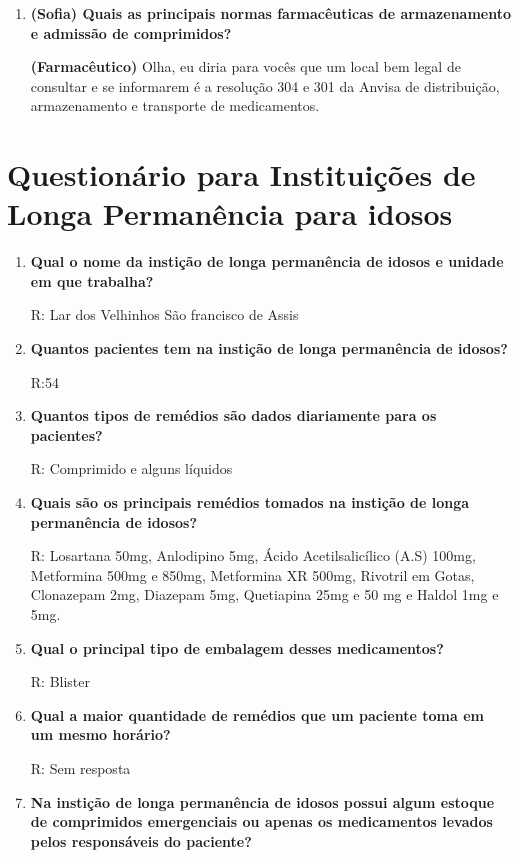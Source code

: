 \begin{apendicesenv}
\begin{enumerate}
\item \textbf{(Sofia) Quais as principais normas farmacêuticas de armazenamento e admissão de comprimidos?}

\textbf{(Farmacêutico)} Olha, eu diria para vocês que um local bem legal de consultar e se informarem é a resolução 304 e 301 da Anvisa de distribuição, armazenamento e transporte de medicamentos. 
\end{enumerate}

\chapter{Questionário para Instituições de Longa Permanência para idosos}\label{questionario_app}

\begin{enumerate}
    \item \textbf{Qual o nome da instição de longa permanência de idosos e unidade em que trabalha?}
    
    R: Lar dos Velhinhos São francisco de Assis
    
    \item \textbf{Quantos pacientes tem na instição de longa permanência de idosos?}
    
    R:54
    
    \item \textbf{Quantos tipos de remédios são dados diariamente para os pacientes?}
    
    R: Comprimido e alguns líquidos
    
    \item \textbf{Quais são os principais remédios tomados na instição de longa permanência de idosos?}
    
    R: Losartana 50mg, Anlodipino 5mg, Ácido Acetilsalicílico (A.S) 100mg, Metformina 500mg e 850mg, Metformina XR 500mg, Rivotril em Gotas, Clonazepam 2mg, Diazepam 5mg, Quetiapina 25mg e 50 mg e Haldol 1mg e 5mg.
    
    \item \textbf{Qual o principal tipo de embalagem desses medicamentos?}
    
    R: Blister
    
    \item \textbf{Qual a maior quantidade de remédios que um paciente toma em um mesmo horário?}
    
    R: Sem resposta
    
    \item \textbf{Na instição de longa permanência de idosos possui algum estoque de comprimidos emergenciais ou apenas os medicamentos levados pelos responsáveis do paciente?}
    

\end{enumerate}
\end{apendicesenv}
